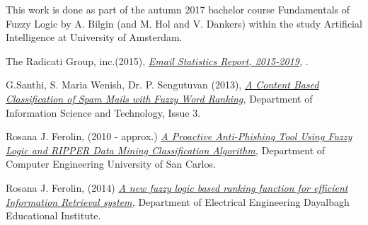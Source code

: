 \documentclass[journal]{IEEEtran}
\begin{document}
This work is done as part of the autumn 2017 bachelor course Fundamentals of Fuzzy Logic by A. Bilgin (and  M. Hol and V. Dankers) within the study Artificial Intelligence at University of Amsterdam.


\begin{thebibliography}{9}
    The Radicati Group, inc.(2015),
    \textit{
        \href{https://github.com/Menziess/Fuzzy-Logic-Email-Classification/raw/master/report/res/a_new_fuzzy_logic_based_ranking_function_for_efficient_information_retrieval_system.pdf}{Email Statistics Report, 2015-2019},
    }.

    G.Santhi, S. Maria Wenish, Dr. P. Sengutuvan (2013),
    \textit{
        \href{https://github.com/Menziess/Fuzzy-Logic-Email-Classification/raw/master/report/res/a_content_based_classification_of_spam_mails_with_fuzzy_word_ranking.pdf}{A Content Based Classification of Spam Mails with Fuzzy Word Ranking},
    }
    Department of Information Science and Technology,
    Issue 3.

    Rosana J. Ferolin, (2010 - approx.)
    \textit{
        \href{https://github.com/Menziess/Fuzzy-Logic-Email-Classification/raw/master/report/res/a_proactive_anti-phishing_tool_using_fuzzy_logic_and_ripper_data_mining_classification_algorithm.pdf}{A Proactive Anti-Phishing Tool Using Fuzzy Logic and RIPPER Data Mining Classification Algorithm},
    }
    Department of Computer Engineering University of San Carlos.

    Rosana J. Ferolin, (2014)
    \textit{
        \href{https://github.com/Menziess/Fuzzy-Logic-Email-Classification/raw/master/report/res/a_new_fuzzy_logic_based_ranking_function_for_efficient_information_retrieval_system.pdf}{A new fuzzy logic based ranking function for efficient Information Retrieval system},
    }
    Department of Electrical Engineering Dayalbagh Educational Institute.

\end{thebibliography}
\end{document}
